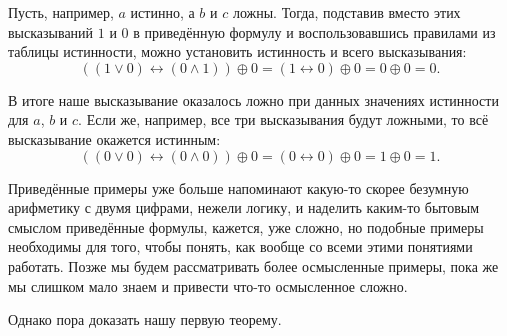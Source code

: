 Пусть, например, $a$ истинно, а $b$ и $c$ ложны. Тогда, подставив вместо этих высказываний $1$ и $0$ в приведённую формулу и воспользовавшись правилами из таблицы истинности, можно установить истинность и всего высказывания:
$$
((1 \lor 0) \leftrightarrow (0 \land 1)) \oplus 0 = (1 \leftrightarrow 0) \oplus 0 = 0 \oplus 0 = 0.
$$

В итоге наше высказывание оказалось ложно при данных значениях истинности для $a$, $b$ и $c$. Если же, например, все три высказывания будут ложными, то всё высказывание окажется истинным:
$$
((0 \lor 0) \leftrightarrow (0 \land 0)) \oplus 0 = (0 \leftrightarrow 0) \oplus 0 = 1 \oplus 0 = 1.
$$

Приведённые примеры уже больше напоминают какую-то скорее безумную арифметику с двумя цифрами, нежели логику, и наделить каким-то бытовым смыслом приведённые формулы, кажется, уже сложно, но подобные примеры необходимы для того, чтобы понять, как вообще со всеми этими понятиями работать. Позже мы будем рассматривать более осмысленные примеры, пока же мы слишком мало знаем и привести что-то осмысленное сложно.

Однако пора доказать нашу первую теорему.

